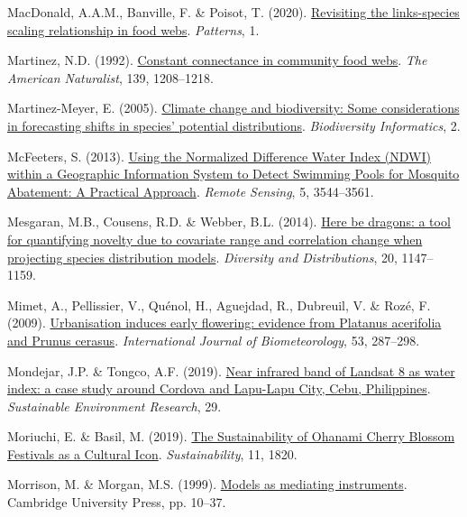 \documentclass[
  letterpaper,
]{scrbook}
\newlength{\cslhangindent}
\newenvironment{CSLReferences}[2] %
 {\begin{list}{}{%
  \setlength{\itemindent}{0pt}
  \setlength{\leftmargin}{0pt}
  \setlength{\parsep}{0pt}
  \ifodd #1
   \setlength{\leftmargin}{\cslhangindent}
   \setlength{\itemindent}{-1\cslhangindent}
  \fi
  \setlength{\itemsep}{#2\baselineskip}}}
 {\end{list}}
\begin{document}
\begin{CSLReferences}{1}{0}
MacDonald, A.A.M., Banville, F. \& Poisot, T. (2020).
\href{https://doi.org/10.1016/j.patter.2020.100079}{Revisiting the
links-species scaling relationship in food webs}. \emph{Patterns}, 1.

Martinez, N.D. (1992).
\href{http://www.jstor.org/stable/2462337}{Constant connectance in
community food webs}. \emph{The American Naturalist}, 139, 1208--1218.

Martinez-Meyer, E. (2005).
\href{https://doi.org/10.17161/bi.v2i0.8}{Climate change and
biodiversity: Some considerations in forecasting shifts in species'
potential distributions}. \emph{Biodiversity Informatics}, 2.

McFeeters, S. (2013). \href{https://doi.org/10.3390/rs5073544}{Using the
Normalized Difference Water Index (NDWI) within a Geographic Information
System to Detect Swimming Pools for Mosquito Abatement: A Practical
Approach}. \emph{Remote Sensing}, 5, 3544--3561.

Mesgaran, M.B., Cousens, R.D. \& Webber, B.L. (2014).
\href{https://doi.org/10.1111/ddi.12209}{Here be dragons: a tool for
quantifying novelty due to covariate range and correlation change when
projecting species distribution models}. \emph{Diversity and
Distributions}, 20, 1147--1159.

Mimet, A., Pellissier, V., Quénol, H., Aguejdad, R., Dubreuil, V. \&
Rozé, F. (2009).
\href{https://doi.org/10.1007/s00484-009-0214-7}{Urbanisation induces
early flowering: evidence from Platanus acerifolia and Prunus cerasus}.
\emph{International Journal of Biometeorology}, 53, 287--298.

Mondejar, J.P. \& Tongco, A.F. (2019).
\href{https://doi.org/10.1186/s42834-019-0016-5}{Near infrared band of
Landsat 8 as water index: a case study around Cordova and Lapu-Lapu
City, Cebu, Philippines}. \emph{Sustainable Environment Research}, 29.

Moriuchi, E. \& Basil, M. (2019).
\href{https://doi.org/10.3390/su11061820}{The Sustainability of Ohanami
Cherry Blossom Festivals as a Cultural Icon}. \emph{Sustainability}, 11,
1820.

Morrison, M. \& Morgan, M.S. (1999).
\href{https://doi.org/10.1017/cbo9780511660108.003}{Models as mediating
instruments}. Cambridge University Press, pp. 10--37.


\end{CSLReferences}
\end{document}
